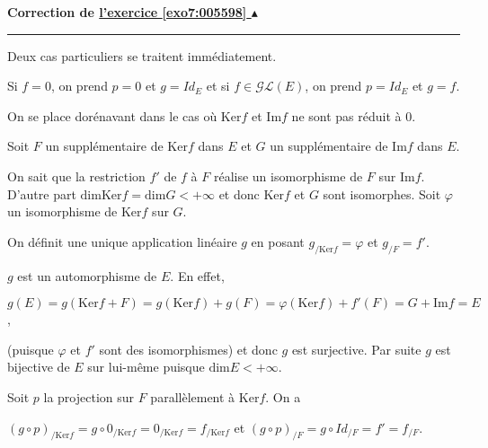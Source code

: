 \documentclass[11pt,a4paper]{article}
\newcommand{\finexercice}{}
\newcommand{\noindication}{}
\newcounter{exo}
\newcommand{\correction}[1]{\hypertarget{cor7:#1}{}\label{cor7:#1}{\bf Correction de \hyperlink{exo7:#1}{l'exercice \ref{exo7:#1} $\blacktriangle$}}\vspace{1mm}\hrule\vspace{1mm}}
\newcommand{\finenonces}{\newpage}
\newcommand{\finindications}{\newpage}
\begin{document}
\finexercice

\finfiche



 \finenonces 



 \finindications 

\noindication
\noindication
\noindication
\noindication
\noindication
\noindication
\noindication
\noindication
\noindication
\noindication
\noindication
\noindication
\noindication
\noindication
\noindication
\noindication
\noindication
\noindication
\noindication
\noindication
\noindication
\noindication
\noindication
\noindication
\noindication
\noindication
\noindication
\noindication
\noindication
\noindication
\noindication


\newpage

\correction{005598}
Deux cas particuliers se traitent immédiatement.

Si $f=0$, on prend $p=0$ et $g=Id_E$ et si $f\in\mathcal{GL}(E)$, on prend $p=Id_E$ et $g=f$. 

On se place dorénavant dans le cas où $\text{Ker}f$ et $\text{Im}f$ ne sont pas réduit à ${0}$.

Soit $F$ un supplémentaire de $\text{Ker}f$ dans $E$ et $G$ un  supplémentaire de $\text{Im}f$ dans $E$.

On sait que la restriction $f'$ de $f$ à $F$ réalise un isomorphisme de $F$ sur $\text{Im}f$. D'autre part $\text{dim}\text{Ker}f=\text{dim}G<+\infty$ et donc $\text{Ker}f$ et $G$ sont isomorphes. Soit $\varphi$ un isomorphisme de $\text{Ker}f$ sur $G$.

On définit une unique application linéaire $g$ en posant $g_{/\text{Ker}f}=\varphi$ et $g_{/F}=f'$.

$g$ est un automorphisme de $E$. En effet,

\begin{center}
$g(E)=g(\text{Ker}f +F)=g(\text{Ker}f) +g(F)=\varphi(\text{Ker}f) + f'(F)=G +\text{Im}f=E$,
\end{center}

(puisque $\varphi$ et $f'$ sont des isomorphismes) et donc $g$ est surjective. Par suite $g$ est bijective de $E$ sur lui-même puisque $\text{dim}E<+\infty$.

Soit $p$ la projection sur $F$ parallèlement à $\text{Ker}f$. On a

\begin{center}
$(g\circ p)_{/\text{Ker}f}= g\circ0_{/\text{Ker}f}= 0_{/\text{Ker}f}=f_{/\text{Ker}f}$ et $(g\circ p)_{/F}=g\circ Id_{/F}=f'=f_{/F}$.
\end{center}
\end{document}
